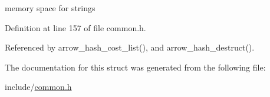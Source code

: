 memory space for strings 

Definition at line 157 of file common.h.

Referenced by arrow\_\-hash\_\-cost\_\-list(), and arrow\_\-hash\_\-destruct().

The documentation for this struct was generated from the following file:\begin{CompactItemize}
\item 
include/\hyperlink{common_8h}{common.h}\end{CompactItemize}
